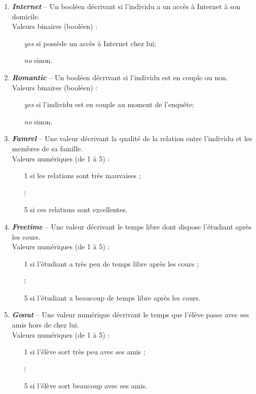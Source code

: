 \documentclass[11pt]{article}
\begin{document}
\begin{enumerate}
\item \textbf{\emph{Internet}} \--- Un booléen décrivant si l'individu a un accès à Internet à son domicile. 
	\\\textsf{Valeurs binaires (booléen) : }\begin{itemize}
	\item[\textbullet] \emph{yes} si possède un accès à Internet chez lui;
	\item[\textbullet] \emph{no} sinon.
	\end{itemize}
	
\item \textbf{\emph{Romantic}} \--- Un booléen décrivant si l'individu est en couple ou non. 
	\\\textsf{Valeurs binaires (booléen) : }\begin{itemize}
	\item[\textbullet] \emph{yes} si l'individu est en couple au moment de l'enquête;
	\item[\textbullet] \emph{no} sinon.
	\end{itemize}
	
\item \textbf{\emph{Famrel}} \--- Une valeur décrivant la qualité de la relation entre l'individu et les membres de sa famille. 
	\\\textsf{Valeurs numériques (de 1 à 5) : }\begin{itemize}
	\item[\textbullet] 1 si les relations sont très mauvaises ;
	\item[$\vdots$] 
	\item[\textbullet] 5 si ces relations sont excellentes.
	\end{itemize}
	
\item \textbf{\emph{Freetime}} \--- Une valeur décrivant le temps libre dont dispose l'étudiant après les cours. 
	\\\textsf{Valeurs numériques (de 1 à 5) : }\begin{itemize}
	\item[\textbullet] 1 si l'étudiant a très peu de temps libre après les cours ;
	\item[$\vdots$] 
	\item[\textbullet] 5 si l'étudiant a beaucoup de temps libre après les cours.
	\end{itemize}
	
\item \textbf{\emph{Goout}} \--- Une valeur numérique décrivant le temps que l'élève passe avec ses amis hors de chez lui. 
	\\\textsf{Valeurs numériques (de 1 à 5) : }\begin{itemize}
	\item[\textbullet] 1 si l'élève sort très peu avec ses amis ;
	\item[$\vdots$] 
	\item[\textbullet] 5 si l'élève sort beaucoup avec ses amis.
	\end{itemize}
	

\end{enumerate}
\end{document}
